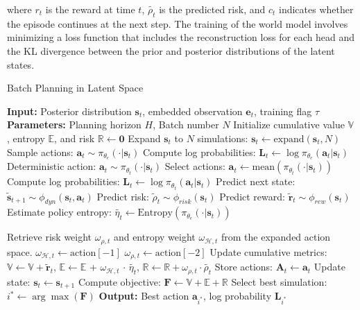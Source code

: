 where $r_t$ is the reward at time $t$, $\widetilde{\rho_t}$ is the predicted risk, and $c_t$ indicates whether the episode continues at the next step. 
The training of the world model involves minimizing a loss function that includes the reconstruction loss for each head and the KL divergence between the prior and posterior distributions of the latent states.
\begin{algorithm}[H]
    \caption{Batch Planning in Latent Space}
    \label{alg:batch_planning}
    \begin{algorithmic}[1]
    \State \textbf{Input:} Posterior distribution $\mathbf{s}_t$, embedded observation $\mathbf{e}_t$, training flag $\tau$
    \State \textbf{Parameters:} Planning horizon $H$, Batch number $N$
    \State Initialize cumulative value $\mathbb{V}$, entropy $\mathbb{E}$, and risk $\mathbb{R} \gets \mathbf{0}$
    \State Expand $\mathbf{s}_t$ to $N$ simulations: $\mathbf{s}_t \gets \text{expand}(\mathbf{s}_t, N)$
          
            \State Sample actions: $\mathbf{a}_t \sim \pi_{\theta_e}(\cdot|\mathbf{s}_t)$ 
            \State Compute log probabilities: $\mathbf{L}_t \gets \log \pi_{\theta_e}(\mathbf{a}_t|\mathbf{s}_t)$
        \Else {}
            \State Deterministic action: $\mathbf{a}_t \sim \pi_{\theta_t}(\cdot|\mathbf{s}_t)$ 
            \State Select actions: $\mathbf{a}_t \gets \text{mean}(\pi_{\theta_t}(\cdot|\mathbf{s}_t))$  
            \State Compute log probabilities: $\mathbf{L}_t \gets \log \pi_{\theta_t}(\mathbf{a}_t|\mathbf{s}_t)$
        \EndIf
        \State Predict next state: $\widetilde{\mathbf{s}}_{t+1} \sim \phi_{dyn}(\mathbf{s}_t, \mathbf{a}_t)$
        \State Predict risk: $\widetilde{\rho}_t \sim \phi_{risk}(\mathbf{s}_t)$
        \State Predict reward: $\widetilde{\mathbf{r}}_t \sim \phi_{rew}(\mathbf{s}_t)$
        \State Estimate policy entropy: $\widetilde{\eta_t} \gets \text{Entropy}(\pi_{\theta_e}(\cdot|\mathbf{s}_t))$
        
        \State Retrieve risk weight \(\omega_{\rho, t}\) and entropy weight \(\omega_{\mathcal{H}, t}\) from the expanded action space.
        \State \(\omega_{\mathcal{H}, t} \gets \text{action}[-1]\)  
        \State \(\omega_{\rho, t} \gets \text{action}[-2]\)  
        \State Update cumulative metrics:
        \State $\mathbb{V} \gets \mathbb{V} + \widetilde{\mathbf{r}}_t$, $\mathbb{E} \gets \mathbb{E}$ + $\omega_{\mathcal{H}, t}$ $\cdot$  $\widetilde{\eta_t}$, $\mathbb{R} \gets \mathbb{R} + \omega_{\rho, t} \cdot \widetilde{\rho_t}$
        \State Store actions: $\mathbf{A}_t \gets \mathbf{a}_t$
        \State Update state: $\mathbf{s}_t \gets \mathbf{s}_{t+1}$
    \EndFor
    \State Compute objective: $\mathbf{F} \gets \mathbb{V} + \mathbb{E} + \mathbb{R}$
    \State Select best simulation: $i^* \gets \arg\max(\mathbf{F})$
    \State \textbf{Output:} Best action $\mathbf{a}_{i^*}$, log probability $\mathbf{L}_{i^*}$
    \end{algorithmic}
\end{algorithm}
